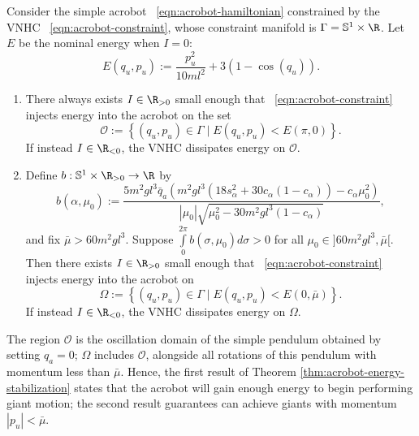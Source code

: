 \begin{thm}\label{thm:acrobot-energy-stabilization}
    Consider the simple acrobot ~\eqref{eqn:acrobot-hamiltonian} constrained by
    the VNHC ~\eqref{eqn:acrobot-constraint}, whose
    constraint manifold is \(\Gamma = \mathbb{S}^1 \times \R\).
    Let \(E\) be the nominal energy when \(I = 0\):
    \[
        E(q_u,p_u) := \frac{p_u^2}{10ml^2} + 3(1 - \cos(q_u))
        .
    \]
\begin{enumerate}
    \item There always exists \(I \in \R_{>0}\) small enough that 
    ~\eqref{eqn:acrobot-constraint} injects energy into the acrobot on the set
    \[
        \mathcal{O} := \left\{(q_u,p_u) \in \Gamma 
            \mid E(q_u,p_u) < E(\pi,0) \right\}
        .
    \]
    If instead \(I \in \R_{<0}\), the VNHC dissipates energy on \(\mathcal{O}\).
\item Define \(b : \mathbb{S}^1 \times \R_{> 0} \rightarrow \R\) by
    \[
        b(\alpha,\mu_0) := 
        \frac{5m^2 g l^3 \bar{q}_a \left(
            m^2gl^3\left(18s_\alpha^2 + 30c_\alpha(1 - c_\alpha)\right)
            - c_\alpha\mu_0^2
        \right)}{
        |\mu_0|\sqrt{\mu_0^2 - 30m^2gl^3(1 - c_\alpha)}
        }
        ,
    \]
    and fix \(\bar{\mu} > 60m^2gl^3\).
    Suppose \(\int \limits_{0}^{2\pi} b(\sigma,\mu_0)d\sigma > 0\) for all 
    \(\mu_0 \in ]60m^2gl^3, \bar{\mu}[\).
    Then there exists \(I \in \R_{> 0}\) small enough that
    ~\eqref{eqn:acrobot-constraint} injects energy into the acrobot on
    \[
        \Omega := \left\{(q_u,p_u) \in \Gamma 
            \mid E(q_u,p_u) < E(0,\bar{\mu})\right\}
        .
    \]
    If instead \(I \in \R_{<0}\), the VNHC dissipates energy on \(\Omega\).
\end{enumerate}
\end{thm}
The region \(\mathcal{O}\) is the oscillation domain of the simple pendulum
obtained by setting \(q_a = 0\);
\(\Omega\) includes \(\mathcal{O}\), alongside all rotations of this 
pendulum with momentum less than \(\bar{\mu}\). 
Hence, the first result of Theorem \ref{thm:acrobot-energy-stabilization} states
that the acrobot will gain enough energy to begin performing giant motion;
the second result guarantees can achieve giants with momentum
\(|p_u| < \bar{\mu}\).

